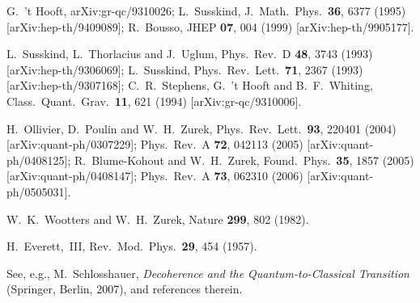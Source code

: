 \documentclass[12pt]{article}
\begin{document}
\begin{thebibliography}{99}
G.~'t Hooft,
arXiv:gr-qc/9310026;
L.~Susskind,
J.\ Math.\ Phys.\  {\bf 36}, 6377 (1995)
[arXiv:hep-th/9409089];
R.~Bousso,
JHEP {\bf 07}, 004 (1999)
[arXiv:hep-th/9905177].

L.~Susskind, L.~Thorlacius and J.~Uglum,
Phys.\ Rev.\  D {\bf 48}, 3743 (1993)
[arXiv:hep-th/9306069];
L.~Susskind,
Phys.\ Rev.\ Lett.\  {\bf 71}, 2367 (1993)
[arXiv:hep-th/9307168];
C.~R.~Stephens, G.~'t Hooft and B.~F.~Whiting,
Class.\ Quant.\ Grav.\  {\bf 11}, 621 (1994)
[arXiv:gr-qc/9310006].

H.~Ollivier, D.~Poulin and W.~H.~Zurek,
Phys.\ Rev.\ Lett.\ {\bf 93}, 220401 (2004)
[arXiv:quant-ph/0307229];
Phys.\ Rev.\  A {\bf 72}, 042113 (2005)
[arXiv:quant-ph/0408125];
R.~Blume-Kohout and W.~H.~Zurek,
Found.\ Phys.\  {\bf 35}, 1857 (2005)
[arXiv:quant-ph/0408147];
Phys.\ Rev.\  A {\bf 73}, 062310 (2006)
[arXiv:quant-ph/0505031].

W.~K.~Wootters and W.~H.~Zurek,
Nature {\bf 299}, 802 (1982).

H.~Everett,~III,
Rev.\ Mod.\ Phys.\  {\bf 29}, 454 (1957).

See, e.g.,
M.~Schlosshauer,
{\it Decoherence and the Quantum-to-Classical Transition}
(Springer, Berlin, 2007),
and references therein.


\end{thebibliography}
\end{document}
